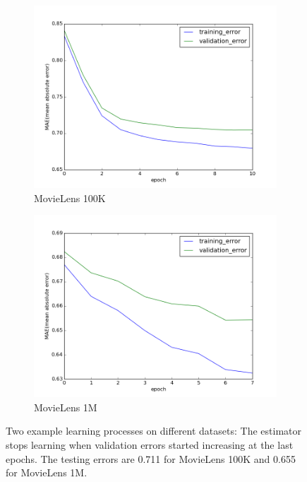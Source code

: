 \documentclass{article}
\begin{document}
\begin{figure}[h]
	\centering
	\begin{subfigure}{0.4\textwidth}
		\includegraphics[width=\textwidth]{movieLens100K}
		\caption{MovieLens 100K}
		\label{fig:movieLens100K}
	\end{subfigure}
	\begin{subfigure}{0.4\textwidth}
		\includegraphics[width=\textwidth]{movieLens1M}
		\caption{MovieLens 1M}
		\label{fig:movieLens1M}
	\end{subfigure}
	\caption{Two example learning processes on different datasets:
	The estimator stops learning when validation errors started increasing at 
	the last epochs. 
	The testing errors are 0.711 for MovieLens 100K and 0.655 for MovieLens 1M.}
	\label{fig:trainnig}
\end{figure}
\end{document}
